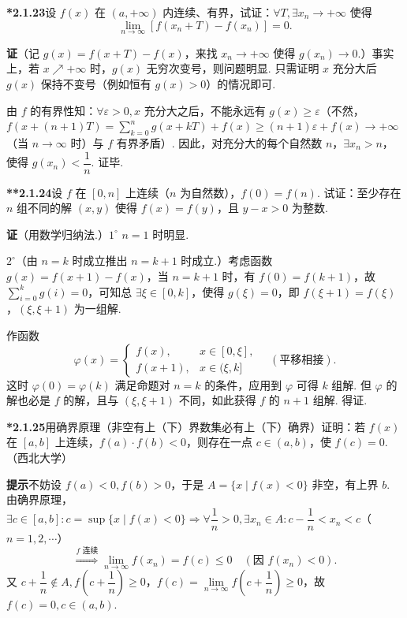 \documentclass[UTF8,12pt,a4paper,fontset=fandol]{ctexart}
\begin{document}
\noindent\textbf{*2.1.23}\quad 设 $f(x)$ 在 $(a,+\infty)$ 内连续、有界，试证：$\forall T,\exists x_n\to+\infty$ 使得
\[
  \lim_{n\to\infty}[f(x_n+T)-f(x_n)]=0.
\]

\noindent\textbf{证}\quad （记 $g(x)=f(x+T)-f(x)$，来找 $x_n\to+\infty$ 使得 $g(x_n)\to0$.）事实上，若 $x\nearrow+\infty$ 时，$g(x)$ 无穷次变号，则问题明显. 只需证明 $x$ 充分大后 $g(x)$ 保持不变号（例如恒有 $g(x)>0$）的情况即可.

由 $f$ 的有界性知：$\forall\varepsilon>0,x$ 充分大之后，不能永远有 $g(x)\ge\varepsilon$（不然，$f(x+(n+1)T)=\sum\limits_{k=0}^{n}g(x+kT)+f(x)\ge(n+1)\varepsilon+f(x)\to+\infty$（当 $n\to\infty$ 时）与 $f$ 有界矛盾）. 因此，对充分大的每个自然数 $n$，$\exists x_n>n$，使得 $g(x_n)<\dfrac1n$. 证毕.

\noindent\textbf{**2.1.24}\quad 设 $f$ 在 $[0,n]$ 上连续（$n$ 为自然数），$f(0)=f(n)$. 试证：至少存在 $n$ 组不同的解 $(x,y)$ 使得 $f(x)=f(y)$，且 $y-x>0$ 为整数.

\noindent\textbf{证}\quad （用数学归纳法.）$1^\circ$ $n=1$ 时明显.

$2^\circ$（由 $n=k$ 时成立推出 $n=k+1$ 时成立.）考虑函数 $g(x)=f(x+1)-f(x)$，当 $n=k+1$ 时，有 $f(0)=f(k+1)$，故 $\sum\limits_{i=0}^{k}g(i)=0$，可知总 $\exists\xi\in[0,k]$，使得 $g(\xi)=0$，即 $f(\xi+1)=f(\xi)$，$(\xi,\xi+1)$ 为一组解.

作函数
\[
  \varphi(x)=
  \begin{cases}
    f(x), & x\in[0,\xi],\\
    f(x+1), & x\in(\xi,k]
  \end{cases}
\quad(\text{平移相接}).
\]
这时 $\varphi(0)=\varphi(k)$ 满足命题对 $n=k$ 的条件，应用到 $\varphi$ 可得 $k$ 组解. 但 $\varphi$ 的解也必是 $f$ 的解，且与 $(\xi,\xi+1)$ 不同，如此获得 $f$ 的 $n+1$ 组解. 得证.

\noindent\textbf{*2.1.25}\quad 用确界原理（非空有上（下）界数集必有上（下）确界）证明：若 $f(x)$ 在 $[a,b]$ 上连续，$f(a)\cdot f(b)<0$，则存在一点 $c\in(a,b)$，使 $f(c)=0$.（西北大学）

\noindent\textbf{提示}\quad 不妨设 $f(a)<0,f(b)>0$，于是 $A=\{x\mid f(x)<0\}$ 非空，有上界 $b$. 由确界原理，$\exists c\in[a,b]:c=\sup\{x\mid f(x)<0\}\Rightarrow \forall\dfrac1n>0,\exists x_n\in A:c-\dfrac1n<x_n<c$（$n=1,2,\cdots$）
\[
  \overset{f\text{ 连续}}{\Longrightarrow}\lim_{n\to\infty}f(x_n)=f(c)\le0\quad(\text{因 }f(x_n)<0).
\]
又 $c+\dfrac1n\notin A,f\left(c+\dfrac1n\right)\ge0$，$f(c)=\lim\limits_{n\to\infty}f\left(c+\dfrac1n\right)\ge0$，故 $f(c)=0,c\in(a,b)$.
\end{document}

